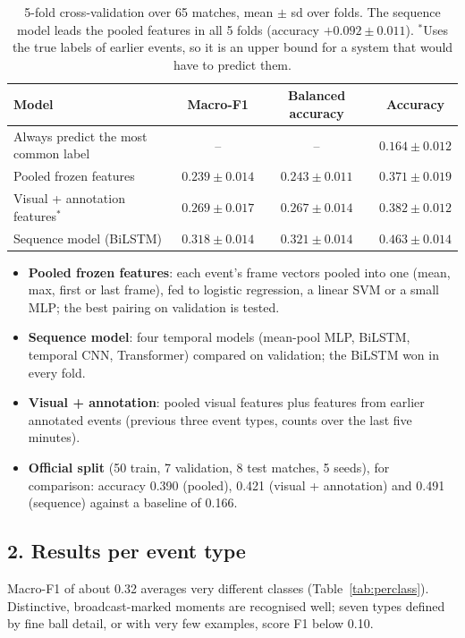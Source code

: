 \documentclass[11pt]{article}
\begin{document}
\begin{table}[h]
\centering\small
\begin{tabular}{lccc}
\toprule
Model & Macro-F1 & Balanced accuracy & Accuracy\\
\midrule
Always predict the most common label & -- & -- & $0.164 \pm 0.012$\\
Pooled frozen features & $0.239 \pm 0.014$ & $0.243 \pm 0.011$ & $0.371 \pm 0.019$\\
Visual + annotation features$^{*}$ & $0.269 \pm 0.017$ & $0.267 \pm 0.014$ & $0.382 \pm 0.012$\\
Sequence model (BiLSTM) & $\mathbf{0.318 \pm 0.014}$ & $\mathbf{0.321 \pm 0.014}$ & $\mathbf{0.463 \pm 0.014}$\\
\bottomrule
\end{tabular}
\caption{5-fold cross-validation over 65 matches, mean $\pm$ sd over folds. The sequence model leads the
pooled features in all 5 folds (accuracy $+0.092 \pm 0.011$). $^{*}$Uses the true labels of earlier events,
so it is an upper bound for a system that would have to predict them.}
\label{tab:cv}
\end{table}

\begin{itemize}[noitemsep]
  \item \textbf{Pooled frozen features}: each event's frame vectors pooled into one (mean, max, first or
        last frame), fed to logistic regression, a linear SVM or a small MLP; the best pairing on validation
        is tested.
  \item \textbf{Sequence model}: four temporal models (mean-pool MLP, BiLSTM, temporal CNN, Transformer)
        compared on validation; the BiLSTM won in every fold.
  \item \textbf{Visual + annotation}: pooled visual features plus features from earlier annotated events
        (previous three event types, counts over the last five minutes).
  \item \textbf{Official split} (50 train, 7 validation, 8 test matches, 5 seeds), for comparison: accuracy
        0.390 (pooled), 0.421 (visual + annotation) and 0.491 (sequence) against a baseline of 0.166.
\end{itemize}

\subsection*{2. Results per event type}
Macro-F1 of about 0.32 averages very different classes (Table~\ref{tab:perclass}). Distinctive,
broadcast-marked moments are recognised well; seven types defined by fine ball detail, or with very few
examples, score F1 below 0.10.
\end{document}
